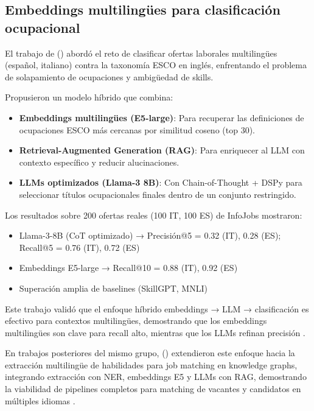 \subsection{Embeddings multilingües para clasificación ocupacional}

El trabajo de \citeauthor{kavas2024} (\citeyear{kavas2024}) abordó el reto de clasificar ofertas laborales multilingües (español, italiano) contra la taxonomía ESCO en inglés, enfrentando el problema de solapamiento de ocupaciones y ambigüedad de skills.

Propusieron un modelo híbrido que combina:

\begin{itemize}
    \item \textbf{Embeddings multilingües (E5-large)}: Para recuperar las definiciones de ocupaciones ESCO más cercanas por similitud coseno (top 30).
    \item \textbf{Retrieval-Augmented Generation (RAG)}: Para enriquecer al LLM con contexto específico y reducir alucinaciones.
    \item \textbf{LLMs optimizados (Llama-3 8B)}: Con Chain-of-Thought + DSPy para seleccionar títulos ocupacionales finales dentro de un conjunto restringido.
\end{itemize}

Los resultados sobre 200 ofertas reales (100 IT, 100 ES) de InfoJobs mostraron:

\begin{itemize}
    \item Llama-3-8B (CoT optimizado) → Precisión@5 = 0.32 (IT), 0.28 (ES); Recall@5 = 0.76 (IT), 0.72 (ES)
    \item Embeddings E5-large → Recall@10 = 0.88 (IT), 0.92 (ES)
    \item Superación amplia de baselines (SkillGPT, MNLI) \parencite{kavas2024}
\end{itemize}

Este trabajo validó que el enfoque híbrido embeddings → LLM → clasificación es efectivo para contextos multilingües, demostrando que los embeddings multilingües son clave para recall alto, mientras que los LLMs refinan precisión \parencite{kavas2024}.

En trabajos posteriores del mismo grupo, \citeauthor{kavas2025} (\citeyear{kavas2025}) extendieron este enfoque hacia la extracción multilingüe de habilidades para job matching en knowledge graphs, integrando extracción con NER, embeddings E5 y LLMs con RAG, demostrando la viabilidad de pipelines completos para matching de vacantes y candidatos en múltiples idiomas \parencite{kavas2025}.

